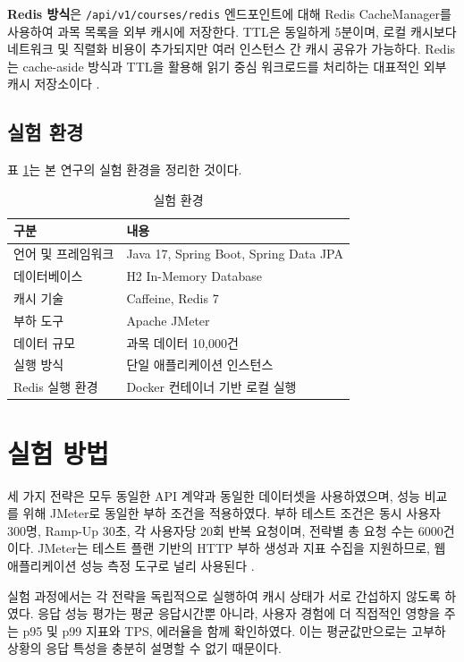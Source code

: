 \documentclass[10pt,a4paper,twocolumn]{article}
\begin{document}
\textbf{Redis 방식}은 \texttt{/api/v1/courses/redis} 엔드포인트에 대해 Redis CacheManager를 사용하여 과목 목록을 외부 캐시에 저장한다. TTL은 동일하게 5분이며, 로컬 캐시보다 네트워크 및 직렬화 비용이 추가되지만 여러 인스턴스 간 캐시 공유가 가능하다. Redis는 cache-aside 방식과 TTL을 활용해 읽기 중심 워크로드를 처리하는 대표적인 외부 캐시 저장소이다 \cite{redis-caching}.

\subsection{실험 환경}

표 \ref{tab:env}는 본 연구의 실험 환경을 정리한 것이다.

\begin{table}[H]
    \centering
    \caption{실험 환경}
    \label{tab:env}
    \footnotesize
    \renewcommand{\arraystretch}{1.15}
    \begin{tabular}{p{}p{}}
        \toprule
        구분 & 내용 \\
        \midrule
        언어 및 프레임워크 & Java 17, Spring Boot, Spring Data JPA \\
        데이터베이스 & H2 In-Memory Database \\
        캐시 기술 & Caffeine, Redis 7 \\
        부하 도구 & Apache JMeter \\
        데이터 규모 & 과목 데이터 10{,}000건 \\
        실행 방식 & 단일 애플리케이션 인스턴스 \\
        Redis 실행 환경 & Docker 컨테이너 기반 로컬 실행 \\
        \bottomrule
    \end{tabular}
\end{table}

\section{실험 방법}

세 가지 전략은 모두 동일한 API 계약과 동일한 데이터셋을 사용하였으며, 성능 비교를 위해 JMeter로 동일한 부하 조건을 적용하였다. 부하 테스트 조건은 동시 사용자 300명, Ramp-Up 30초, 각 사용자당 20회 반복 요청이며, 전략별 총 요청 수는 6000건이다. JMeter는 테스트 플랜 기반의 HTTP 부하 생성과 지표 수집을 지원하므로, 웹 애플리케이션 성능 측정 도구로 널리 사용된다 \cite{jmeter-manual}.

실험 과정에서는 각 전략을 독립적으로 실행하여 캐시 상태가 서로 간섭하지 않도록 하였다. 응답 성능 평가는 평균 응답시간뿐 아니라, 사용자 경험에 더 직접적인 영향을 주는 p95 및 p99 지표와 TPS, 에러율을 함께 확인하였다. 이는 평균값만으로는 고부하 상황의 응답 특성을 충분히 설명할 수 없기 때문이다.
\end{document}
